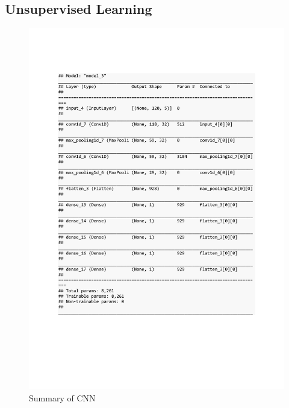 \subsection{Unsupervised Learning}
\begin{figure}[h]
	\centering
	\includegraphics[scale=0.5]{Figures/summary_CNN_pred_syn}
	\decoRule
	\caption[Synthetic Anomalies]{Summary of CNN \parencite{own}}
	\label{fig:summary_CNN_pred_syn}
\end{figure}

